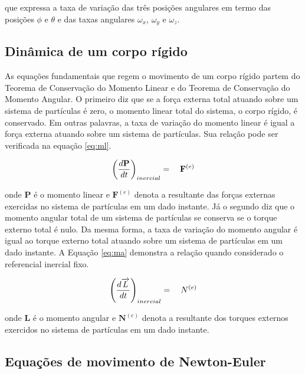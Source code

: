 \documentclass[a4paper, 12pt]{article}
\begin{document}
\noindent que expressa a taxa de variação das três posições angulares em termo das posições $\phi$ e $\theta$ e das taxas angulares ${\omega}_{x}$, ${\omega}_{y}$ e ${\omega}_{z}$.

\subsection{Dinâmica de um corpo rígido}

 

As equações fundamentais que regem o movimento de um corpo rígido partem do Teorema de Conservação do Momento Linear e do Teorema de Conservação do Momento Angular. O primeiro diz que se a força externa total atuando sobre um sistema de partículas é zero, o momento linear total do sistema, o corpo rígido, é conservado. Em outras palavras, a taxa de variação do momento linear é igual a força externa atuando sobre um sistema de partículas. Sua relação pode ser verificada na equação \ref{eq:ml}.

\begin{equation}
\centering
{ \left(\frac { d\mathbf{P} }{ dt }\right)}_{inercial} = \quad{ \mathbf{F} }^{ (e) }
\label{eq:ml}
\end{equation}

\noindent onde $\mathbf{P}$ é o momento linear e ${ \mathbf{F} }^{ (e) }$ denota a resultante das forças externas exercidas no sistema de partículas em um dado instante. Já o segundo diz que o momento angular total de um sistema de partículas se conserva se o torque externo total é nulo. Da mesma forma, a taxa de variação do momento angular é igual ao torque externo total atuando sobre um sistema de partículas em um dado instante. A Equação \ref{eq:ma} demonstra a relação quando considerado o referencial inercial fixo.

\begin{equation}
\centering
{ \left( \frac { d\overrightarrow { L } }{ dt }  \right)  }_{ inercial }=\quad { N }^{ (e) }
\label{eq:ma}
\end{equation}

\noindent onde $\mathbf{L}$ é o momento angular e ${ \mathbf{N} }^{ (e) }$ denota a resultante dos torques externos exercidos no sistema de partículas em um dado instante. 

\subsection{Equações de movimento de Newton-Euler}
\end{document}

